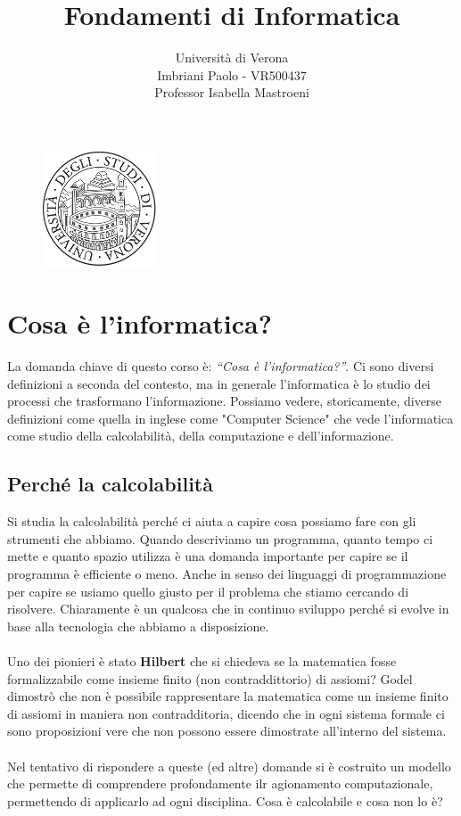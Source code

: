 \documentclass[a4paper]{article}
\title{Fondamenti di Informatica}
\author{Università di Verona\\Imbriani Paolo - VR500437\\Professor Isabella Mastroeni}
\begin{document}
\begin{figure}
    \centering
    \includegraphics[width=0.3\textwidth]{../UniversityofVerona.png}
    \label{fig:centered-image}
\end{figure}

\maketitle

\pagebreak

\tableofcontents

\pagebreak

\section{Cosa è l'informatica?}

La domanda chiave di questo corso è: \textit{``Cosa è l'informatica?''}. 
Ci sono diversi definizioni a seconda del contesto, ma in generale l'informatica è lo studio dei processi che trasformano l'informazione.
Possiamo vedere, storicamente, diverse definizioni come quella in inglese come "Computer Science" che vede
l'informatica come studio della calcolabilità, della computazione e dell'informazione.

\subsection{Perché la calcolabilità}

Si studia la calcolabilità perché ci aiuta a capire cosa possiamo fare con gli strumenti che abbiamo.
Quando descriviamo un programma, quanto tempo ci mette e quanto spazio utilizza è una domanda importante 
per capire se il programma è efficiente o meno. Anche in senso dei linguaggi di programmazione per capire se usiamo
quello giusto per il problema che stiamo cercando di risolvere. Chiaramente è un qualcosa che in continuo
sviluppo perché si evolve in base alla tecnologia che abbiamo a disposizione.
\\
\\
Uno dei pionieri è stato \textbf{Hilbert} che si chiedeva se la matematica fosse formalizzabile come insieme
finito (non contraddittorio) di assiomi? Godel dimostrò che non è possibile rappresentare la matematica 
come un insieme finito di assiomi in maniera non contradditoria, dicendo che in ogni sistema formale
ci sono proposizioni vere che non possono essere dimostrate all'interno del sistema.
\\
\\
Nel tentativo di rispondere a queste (ed altre) domande si è costruito un modello che 
permette di comprendere profondamente ilr agionamento computazionale,
permettendo di applicarlo ad ogni disciplina.
Cosa è calcolabile e cosa non lo è? 
\end{document}
